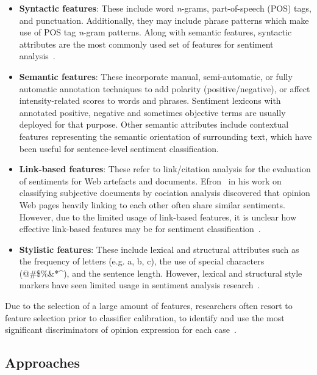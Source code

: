 \begin{itemize}
 \item \textbf{Syntactic features}:
 These include word \emph{n}-grams, part-of-speech (POS) tags, and punctuation.
 Additionally, they may include phrase patterns
 which make use of POS tag \emph{n}-gram patterns.
 Along with semantic features,
 syntactic attributes are the most commonly used set of features
 for sentiment analysis~\cite{ACS08}.
 
 \item \textbf{Semantic features}:
 These incorporate manual, semi-automatic,
 or fully automatic annotation techniques to add polarity (positive/negative),
 or affect intensity-related scores to words and phrases.
 Sentiment lexicons with annotated positive, negative
 and sometimes objective terms are usually deployed for that purpose.
 Other semantic attributes include contextual features
 representing the semantic orientation of surrounding text,
 which have been useful for sentence-level sentiment classification.
 
 \item \textbf{Link-based features}:
 These refer to link/citation analysis
 for the evaluation of sentiments for Web artefacts and documents.
 Efron~\cite{Efr08} in his work
 on classifying subjective documents by cociation analysis
 discovered that opinion Web pages heavily linking to each other
 often share similar sentiments.
 However, due to the limited usage of link-based features,
 it is unclear how effective link-based features may be
 for sentiment classification~\cite{ACS08}.
 
 \item \textbf{Stylistic features}:
 These include lexical and structural attributes such as
 the frequency of letters (e.g. a, b, c),
 the use of special characters (@\#\$\%\&*\^{}),
 and the sentence length.
 However, lexical and structural style markers have seen limited usage
 in sentiment analysis research~\cite{ACS08}. 
\end{itemize}

Due to the selection of a large amount of features,
researchers often resort to feature selection prior to classifier calibration,
to identify and use the most significant discriminators of
opinion expression for each case~\cite{GSZ13,ACS08,Gam04}.

\subsection{Approaches}
\label{subsec:approaches}

